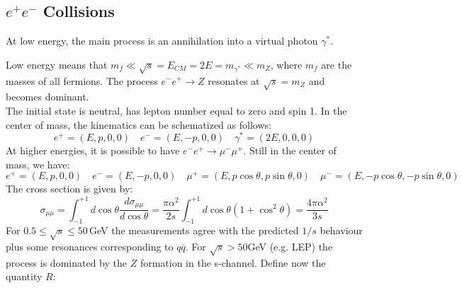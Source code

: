\documentclass[10.75pt,a4paper,openright,bottom=2cm]{article}
\begin{document}
\subsection{$e^+e^-$ Collisions}
At low energy, the main process is an annihilation into a virtual photon $\gamma^*$. 
\begin{center}
\end{center}
Low energy means that $m_f\ll\sqrt{s}=E_{CM}=2E=m_{\gamma^*}\ll m_Z$, where $m_f$ are the masses of all fermions. The process $e^-e^+\to Z$ resonates at $\sqrt{s}=m_Z$ and becomes dominant.\\
The initial state is neutral, has lepton number equal to zero and spin 1. In the center of mass, the kinematics can be schematized as follows:
\[
e^+=(E,p,0,0) \quad e^-=(E,-p,0,0) \quad \gamma^*=(2E,0,0,0)
\]
At higher energies, it is possible to have $e^-e^+\to\mu^-\mu^+$. Still in the center of mass, we have:
\[
e^+=(E,p,0,0) \quad e^-=(E,-p,0,0) \quad \mu^+=(E,p\cos\theta,p\sin\theta,0) \quad \mu^-=(E,-p\cos\theta,-p\sin\theta,0)
\]
The cross section is given by:
\[
\sigma_{\mu\mu}=\int_{-1}^{+1}d\cos\theta\frac{d\sigma_{\mu\mu}}{d\cos\theta}=\frac{\pi\alpha^2}{2s}\int_{-1}^{+1}d\cos\theta(1+\cos^2\theta)=\frac{4\pi\alpha^2}{3s}
\]
For $0.5\le\sqrt{s}\le50$\,GeV the measurements agree with the predicted $1/s$ behaviour plus some resonances corresponding to $q\overline{q}$. For $\sqrt{s}>50$\;GeV (e.g. LEP) the process is dominated by the $Z$ formation in the s-channel. Define now the quantity $R$:
\end{document}
